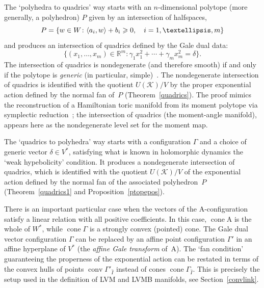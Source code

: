 \documentclass[a4paper]{amsart}
\theoremstyle{definition}
\theoremstyle{remark}
\numberwithin{equation}{section}
\def\R{\mathbb R}
\def\R{\mathbb R}
\def\sK{\mathcal K}
\newcommand{\mb}[1]{{\textbf {\textit#1}}}
\renewcommand{\ge}{\geqslant}
\def\cone{\mathop{\mathrm{cone}}}
\def\conv{\mathop{\mathrm{conv}}}
\newcommand{\<}{\langle}
\renewcommand{\>}{\rangle}
\begin{document}
The `polyhedra to quadrics' way starts with an $n$-dimensional polytope (more generally, a polyhedron) $P$ given by an intersection of halfspaces,
\[
  P=\{\mb w\in W\colon\langle \mb a_i,\mb w\rangle+b_i\ge0,\quad i=1,\ldots,m\}
\] 
and produces an intersection of quadrics defined by the Gale dual data:
\[
  \{(x_1,\ldots,x_m)\in\R^m\colon\gamma_1 x^2_1+ 
  \cdots+\gamma_mx^2_m=\delta\}.
\]
The intersection of quadrics is nondegenerate (and therefore smooth) if and only if the polytope is \emph{generic} (in particular, simple)~\cite[Theorem~6.1.3]{bu-pa15}. The nondegenerate intersection of quadrics is identified with the quotient $U(\sK)/V$ by the proper exponential action defined by the normal fan of~$P$ (Theorem~\ref{quadrics}). The proof mimics the reconstruction of a Hamiltonian toric manifold from its moment polytope via symplectic reduction~\cite{delz88,audi91,guil94}; the intersection of quadrics (the moment-angle manifold), appears here as the nondegenerate level set for the moment map. %

The `quadrics to polyhedra' way starts with a configuration $\Gamma$ and a choice of generic vector $\delta\in V^*$, satisfying what is known in holomorphic dynamics the `weak hypebolicity' condition. It produces a nondegenerate intersection of quadrics, which is identified with the quotient $U(\sK)/V$ of the exponential action defined by the normal fan of the associated polyhedron~$P$ (Theorem~\ref{quadrics1} and Proposition~\ref{ptopepos}). 

There is an important particular case when the vectors of the $\mathrm A$-configuration satisfy a linear relation with all positive coefficients. In this case, $\cone \mathrm A$ is the whole of $W^*$, while $\cone\Gamma$ is a strongly convex (pointed) cone.
The Gale dual vector configuration $\Gamma$ can be replaced by an affine point configuration $\Gamma'$ in an affine hyperplane of $V^*$ (the \emph{affine Gale transform} of~$\mathrm A$). The `fan condition' guaranteeing the properness of the exponential action can be restated in terms of the convex hulls of points $\conv\Gamma'_{\widehat I}$ instead of cones $\cone\Gamma_{\widehat I}$. This is precisely the setup used in the definition of LVM and LVMB manifolds, see Section~\ref{convlink}.
\end{document}
